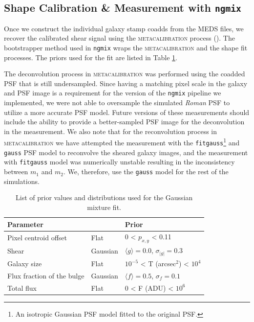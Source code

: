 \documentclass[fleqn,usenatbib]{mnras}
\begin{document}
\subsection{Shape Calibration \& Measurement with \texttt{ngmix}}
\label{subsec:mcal}
Once we construct the individual galaxy stamp coadds from the MEDS files, we recover the calibrated shear signal using the \textsc{metacalibration} process (\citealt{2017arXiv170202600H, 2017ApJ...841...24S}). The bootstrapper method used in \texttt{ngmix} wraps the \textsc{metacalibration} and the shape fit processes. The priors used for the fit are listed in Table \ref{tab:priors}.

The deconvolution process in  \textsc{metacalibration} was performed using the coadded PSF that is still undersampled. Since having a matching pixel scale in the galaxy and PSF image is a requirement for the version of the \texttt{ngmix} pipeline we implemented, we were not able to oversample the simulated \emph{Roman} PSF to utilize a more accurate PSF model. Future versions of these measurements should include the ability to provide a better-sampled PSF image for the deconvolution in the measurement. 
We also note that for the reconvolution process in \textsc{metacalibration} we have attempted the measurement with the \texttt{fitgauss}\footnote{An isotropic Gaussian PSF model fitted to the original PSF.} and \texttt{gauss} PSF model to reconvolve the sheared galaxy images, and the measurement with \texttt{fitgauss} model was numerically unstable resulting in the inconsistency between $m_{1}$ and $m_{2}$. We, therefore, use the \texttt{gauss} model for the rest of the simulations.

\begin{table}
    \centering
    \begin{tabular}{l l l}
    \hline
    Parameter & &  Prior \\
    \hline
    Pixel centroid offset & Flat & 0 < $p_{x,y}$ < 0.11\\
    Shear & Gaussian &$\langle g\rangle = 0.0$, $\sigma_{|g|} = 0.3$\\
    Galaxy size & Flat &$10^{-5}$ < T (arcsec$^2$) < $10^{4}$\\
    Flux fraction of the bulge  & Gaussian &$\langle f\rangle = 0.5$, $\sigma_{f} = 0.1$\\
    Total flux & Flat &$0$ < F (ADU) < $10^{6}$\\
    \hline
    \end{tabular}
    \caption{List of prior values and distributions used for the Gaussian mixture fit.}
    \label{tab:priors}
\end{table}
\end{document}
